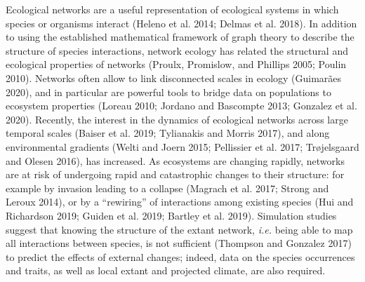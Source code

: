 \documentclass[10pt,oneside]{article}
\begin{document}
Ecological networks are a useful representation of ecological systems in
which species or organisms interact (Heleno et al. 2014; Delmas et al.
2018). In addition to using the established mathematical framework of
graph theory to describe the structure of species interactions, network
ecology has related the structural and ecological properties of networks
(Proulx, Promislow, and Phillips 2005; Poulin 2010). Networks often
allow to link disconnected scales in ecology (Guimarães 2020), and in
particular are powerful tools to bridge data on populations to ecosystem
properties (Loreau 2010; Jordano and Bascompte 2013; Gonzalez et al.
2020). Recently, the interest in the dynamics of ecological networks
across large temporal scales (Baiser et al. 2019; Tylianakis and Morris
2017), and along environmental gradients (Welti and Joern 2015;
Pellissier et al. 2017; Trøjelsgaard and Olesen 2016), has increased. As
ecosystems are changing rapidly, networks are at risk of undergoing
rapid and catastrophic changes to their structure: for example by
invasion leading to a collapse (Magrach et al. 2017; Strong and Leroux
2014), or by a ``rewiring'' of interactions among existing species (Hui
and Richardson 2019; Guiden et al. 2019; Bartley et al. 2019).
Simulation studies suggest that knowing the structure of the extant
network, \emph{i.e.} being able to map all interactions between species,
is not sufficient (Thompson and Gonzalez 2017) to predict the effects of
external changes; indeed, data on the species occurrences and traits, as
well as local extant and projected climate, are also required.
\end{document}
